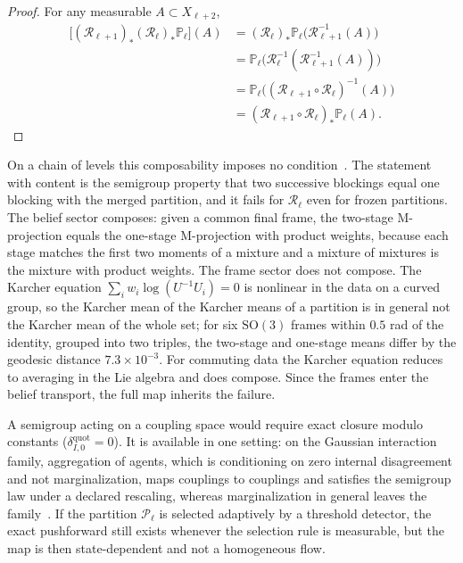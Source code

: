 \begin{proof}
For any measurable $A \subset X_{\ell+2}$,
\begin{align*}
\big[(\mathcal{R}_{\ell+1})_*(\mathcal{R}_\ell)_*\mathbb{P}_\ell\big](A)
 &= (\mathcal{R}_\ell)_*\mathbb{P}_\ell\big(\mathcal{R}_{\ell+1}^{-1}(A)\big) \\
 &= \mathbb{P}_\ell\big(\mathcal{R}_\ell^{-1}(\mathcal{R}_{\ell+1}^{-1}(A))\big) \\
 &= \mathbb{P}_\ell\big((\mathcal{R}_{\ell+1} \circ \mathcal{R}_\ell)^{-1}(A)\big) \\
 &= (\mathcal{R}_{\ell+1} \circ \mathcal{R}_\ell)_*\mathbb{P}_\ell(A).
\end{align*}
\end{proof}

On a chain of levels this composability imposes no condition~\cite[Ch.~9]{DennisGaugeVFE2026}. The statement with content is the semigroup property that two successive blockings equal one blocking with the merged partition, and it fails for $\mathcal{R}_\ell$ even for frozen partitions. The belief sector composes: given a common final frame, the two-stage M-projection equals the one-stage M-projection with product weights, because each stage matches the first two moments of a mixture and a mixture of mixtures is the mixture with product weights. The frame sector does not compose. The Karcher equation $\sum_iw_i\log(U^{-1}U_i)=0$ is nonlinear in the data on a curved group, so the Karcher mean of the Karcher means of a partition is in general not the Karcher mean of the whole set; for six $\mathrm{SO}(3)$ frames within $0.5$ rad of the identity, grouped into two triples, the two-stage and one-stage means differ by the geodesic distance $7.3\times10^{-3}$. For commuting data the Karcher equation reduces to averaging in the Lie algebra and does compose. Since the frames enter the belief transport, the full map inherits the failure.

A semigroup acting on a coupling space would require exact closure modulo constants ($\delta_{I,0}^{\mathrm{quot}}=0$). It is available in one setting: on the Gaussian interaction family, aggregation of agents, which is conditioning on zero internal disagreement and not marginalization, maps couplings to couplings and satisfies the semigroup law under a declared rescaling, whereas marginalization in general leaves the family~\cite[Chs.~G7 and G9]{DennisGaugeVFESuppG2026}. If the partition $\mathcal{P}_\ell$ is selected adaptively by a threshold detector, the exact pushforward still exists whenever the selection rule is measurable, but the map is then state-dependent and not a homogeneous flow.

